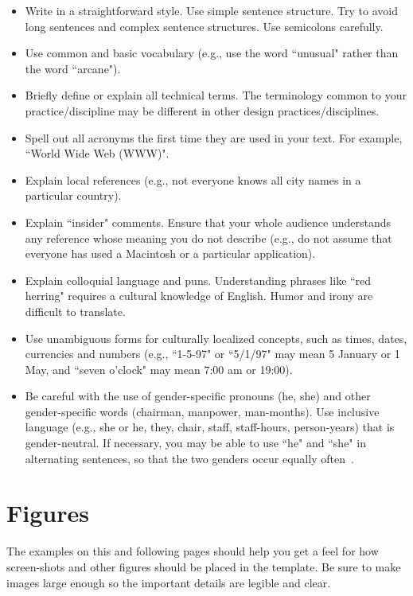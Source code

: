 \documentclass{ubicomp-ext}
\begin{document}
\begin{itemize}\compresslist
\item 	
Write in a straightforward style. 
Use simple sentence structure. 
Try to avoid long sentences and complex sentence structures. 
Use semicolons carefully.
\item 	
Use common and basic vocabulary (e.g., use the word ``unusual" rather than the word ``arcane").
\item 	
Briefly define or explain all technical terms. 
The terminology common to your practice/discipline may be different in other design practices/disciplines.
\item 	
Spell out all acronyms the first time they are used in your text. 
For example, ``World Wide Web (WWW)".
\item 	
Explain local references (e.g., not everyone knows all city names in a particular country).
\item 	
Explain ``insider" comments. 
Ensure that your whole audience understands any reference whose meaning you do not describe (e.g., do not assume that everyone has used a Macintosh or a particular application).
\item 	
Explain colloquial language and puns. 
Understanding phrases like ``red herring" requires a cultural knowledge of English. 
Humor and irony are difficult to translate.
\item 	
Use unambiguous forms for culturally localized concepts, such as times, dates, currencies and numbers (e.g., ``1-5-97" or ``5/1/97" may mean 5 January or 1 May, and ``seven o'clock" may mean 7:00 am or 19:00).
\item 	
Be careful with the use of gender-specific pronouns (he, she) and other gender-specific words (chairman, manpower, man-months). 
Use inclusive language (e.g., she or he, they, chair, staff, staff-hours, person-years) that is gender-neutral. 
If necessary, you may be able to use ``he" and ``she" in alternating sentences, so that the two genders occur equally often~\cite{Schwartz95}. 
\end{itemize}


\section{Figures}
The examples on this and following pages should help you get a feel for how screen-shots and other figures should be placed in the template. 
Be sure to make images large enough so the important details are legible and clear.
\end{document}
